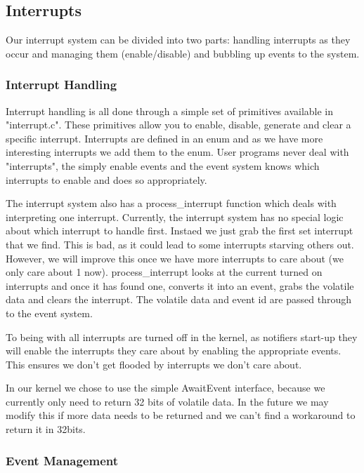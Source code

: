 \documentclass{article}
\begin{document}
\subsection{Interrupts}

Our interrupt system can be divided into two parts: handling interrupts as they occur and managing them (enable/disable) and bubbling up events to the system.

\subsubsection{Interrupt Handling}

Interrupt handling is all done through a simple set of primitives available in "interrupt.c". These primitives allow you to enable, disable, generate and clear a specific interrupt. Interrupts are defined in an enum and as we have more interesting interrupts we add them to the enum. User programs never deal with "interrupts", the simply enable events and the event system knows which interrupts to enable and does so appropriately.

The interrupt system also has a process\_interrupt function which deals with interpreting one interrupt. Currently, the interrupt system has no special logic about which interrupt to handle first. Instaed we just grab the first set interrupt that we find. This is bad, as it could lead to some interrupts starving others out. However, we will improve this once we have more interrupts to care about (we only care about 1 now). process\_interrupt looks at the current turned on interrupts and once it has found one, converts it into an event, grabs the volatile data and clears the interrupt. The volatile data and event id are passed through to the event system.

To being with all interrupts are turned off in the kernel, as notifiers start-up they will enable the interrupts they care about by enabling the appropriate events. This ensures we don't get flooded by interrupts we don't care about.

In our kernel we chose to use the simple AwaitEvent interface, because we currently only need to return 32 bits of volatile data. In the future we may modify this if more data needs to be returned and we can't find a workaround to return it in 32bits.

\subsubsection{Event Management}
\end{document}
